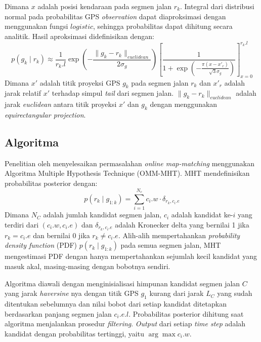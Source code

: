 Dimana $x$ adalah posisi kendaraan pada segmen jalan $r_k$. Integral dari distribusi normal pada probabilitas GPS \textit{observation} dapat diaproksimasi dengan menggunakan fungsi $logistic$, sehingga probabilitas dapat dihitung secara analitik. Hasil aproksimasi didefinisikan dengan:
\begin{equation}
    p(g_k\mid r_k) \approx \frac{1}{r_k.l} \exp \left(-\frac{\lVert g_k-r_k\rVert_{euclidean}}{2\sigma_g}\right)\left[ \frac{1}{1+\exp (-\frac{\pi(x-x'_r)}{\sqrt{3}\sigma_g})} \right]_{x=0}^{r_k.l}
\end{equation}
Dimana $x'$ adalah titik proyeksi GPS $g_k$ pada segmen jalan $r_k$ dan $x'_r$ adalah jarak relatif $x'$ terhadap simpul \textit{tail} dari segmen jalan. $\lVert g_k-r_k\rVert_{euclidean}$ adalah jarak \textit{euclidean} antara titik proyeksi $x'$ dan $g_k$ dengan menggunakan \textit{equirectangular projection}.

\subsection{Algoritma}
\label{subsec:omm-algoritma}
Penelitian oleh \cite{Taguchi2019} menyelesaikan permasalahan \textit{online map-matching} menggunakan Algoritma Multiple Hypothesis Technique (OMM-MHT). MHT mendefinisikan probabilitas posterior dengan:
\begin{equation}
    p(r_k\mid g_{1:k})=\sum_{i=1}^{N_c}c_i.w\cdot \delta_{r_{k},c_i.e}
\end{equation}
Dimana $N_C$ adalah jumlah kandidat segmen jalan, $c_i$ adalah kandidat ke-$i$ yang terdiri dari $(c_i.w, c_i.e)$ dan $\delta_{r_{k},c_i.e}$ adalah Kronecker delta yang bernilai 1 jika $r_{k}=c_i.e$ dan bernilai 0 jika $r_{k}\neq c_i.e$. Alih-alih mempertahankan \textit{probability density function} (PDF) $p(r_k\mid g_{1:k})$ pada semua segmen jalan, MHT mengestimasi PDF dengan hanya mempertahankan sejumlah kecil kandidat yang masuk akal, masing-masing dengan bobotnya sendiri. 

Algoritma diawali dengan menginisialisasi himpunan kandidat segmen jalan $C$ yang jarak \textit{haversine} nya dengan titik GPS $g_1$ kurang dari jarak $L_C$ yang sudah ditentukan sebelumnya dan nilai bobot dari setiap kandidat ditetapkan berdasarkan panjang segmen jalan $c_i.e.l$. Probabilitas posterior dihitung saat algoritma menjalankan prosedur \textit{filtering}. \textit{Output} dari setiap \textit{time step} adalah kandidat dengan probabilitas tertinggi, yaitu $\arg \max c_i.w$.

